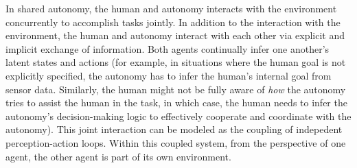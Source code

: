 \documentclass[12pt]{article}
\begin{document}
In shared autonomy, the human and autonomy interacts with the environment concurrently to accomplish tasks jointly. In addition to the interaction with the environment, the human and autonomy interact with each other via explicit and implicit exchange of information. Both agents continually infer one another's latent states and actions (for example, in situations where the human goal is not explicitly specified, the autonomy has to infer the human's internal goal from sensor data. Similarly, the human might not be fully aware of \textit{how} the autonomy tries to assist the human in the task, in which case, the human needs to infer the autonomy's decision-making logic to effectively cooperate and coordinate with the autonomy). This joint interaction can be modeled as the coupling of indepedent perception-action loops. Within this coupled system, from the perspective of one agent, the other agent is part of its own environment.
\end{document}
